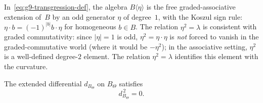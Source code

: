 \begin{remark}
\label{rem:g9-transgression-signs}
In~\eqref{eq:g9-transgression-def}, the algebra $B\langle \eta \rangle$
is the free graded-associative extension of~$B$ by an odd generator
$\eta$ of degree~$1$, with the Koszul sign rule: $\eta \cdot b =
(-1)^{|b|} b \cdot \eta$ for homogeneous $b \in B$. The relation
$\eta^2 = \lambda$ is consistent with graded commutativity: since
$|\eta| = 1$ is odd, $\eta^2 = \eta \cdot \eta$ is
\emph{not} forced to vanish in the graded-commutative world (where it
would be $-\eta^2$); in the associative setting, $\eta^2$ is a
well-defined degree-$2$ element. The relation $\eta^2 = \lambda$
identifies this element with the curvature.
\end{remark}

\begin{proposition}
\label{prop:transgression-kills-curvature}
The extended differential $d_{B_\Theta}$ on $B_\Theta$ satisfies
\begin{equation}\label{eq:g9-dBT-squared}
d_{B_\Theta}^{\,2} = 0.
\end{equation}
\end{proposition}


